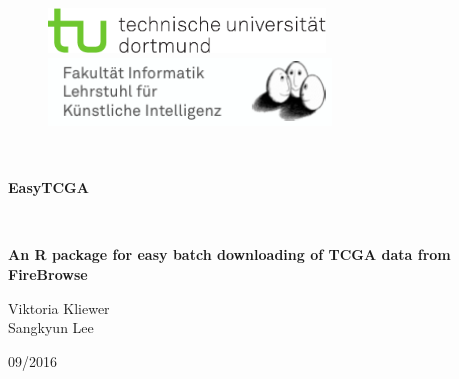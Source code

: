 \documentclass[a4paper,12pt,listof=totoc,bibliography=totoc]{scrartcl}
\begin{document}
\begin{titlepage}


\begin{figure}[htb]
    \begin{minipage}{0.55\linewidth}
        \includegraphics[height=1.2cm]{logo_TUDortmund}
    \end{minipage}
    \begin{minipage}{0.45\linewidth}
        \includegraphics[height=1.8cm]{header-bg-topLeft}
    \end{minipage}
\end{figure}

\ \\
\vfill
\begin{center}
\begin{doublespace}
\begin{LARGE}
\textbf{ EasyTCGA}
\end{LARGE}\\
\begin{Large}
\textbf{An R package for easy batch downloading of TCGA data from FireBrowse}
\end{Large}
\end{doublespace}

\vfill
\begin{large}
Viktoria Kliewer\\
Sangkyun Lee

\vfill
09/2016

\end{large}

\end{center}

\end{titlepage}
\tableofcontents
\thispagestyle{empty}
\clearpage
\setcounter{page}{1}
\onehalfspacing
\pagestyle{plain}%
\end{document}
